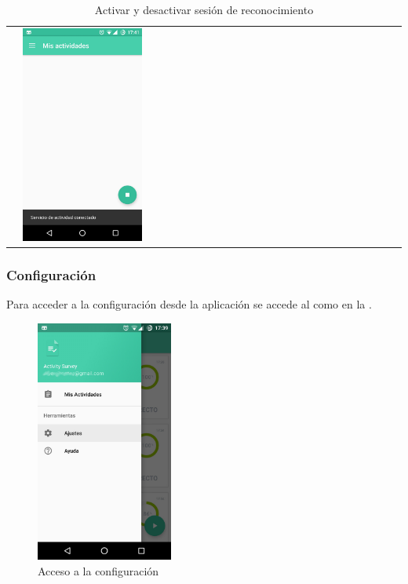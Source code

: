 {\begin{table}[!h]
\begin{tabular}{lll}
 & 
    {\includegraphics[width=0.33\textwidth]{anexos/graphics/enabled_serv.jpg}}
\\
\end{tabular}
    \caption{Activar y desactivar sesión de reconocimiento}\label{config_adic:servstart}
\end{table}

\subsubsection{Configuración}
\label{config_adic:configuracion}
Para acceder a la configuración desde la aplicación se accede al  como en la .
\begin{figure}[!h]
\centering
    \includegraphics[width=0.4\textwidth]{anexos/graphics/mnu_config.jpg}
\caption{Acceso a la configuración}\label{config_adic:id1}
\end{figure}

}
